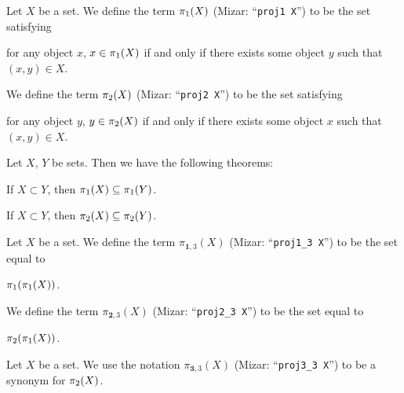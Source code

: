 \documentclass{article}
\begin{document}
\begin{definition}
  Let $X$ be a set.
  We define the term $\pi_{1}(X)$ (Mizar: ``\verb#proj1 X#'') to be the
  set satisfying
  \begin{defn}\label{xtuple0:defn:proj1}
  \item for any object $x$, $x\in\pi_{1}(X)$ if and only if there exists
    some object $y$ such that $(x,y)\in X$.
  \end{defn}
  We define the term $\pi_{2}(X)$ (Mizar: ``\verb#proj2 X#'') to be the
  set satisfying
  \begin{defn}\label{xtuple0:defn:proj2}
  \item for any object $y$, $y\in\pi_{2}(X)$ if and only if there exists
    some object $x$ such that $(x,y)\in X$.
  \end{defn}
\end{definition}

Let $X$, $Y$ be sets. Then we have the following theorems:
\begin{thm}
\item\label{xtuple0:8} If $X\subset Y$, then $\pi_{1}(X)\subseteq\pi_{1}(Y)$.
\item\label{xtuple0:9} If $X\subset Y$, then $\pi_{2}(X)\subseteq\pi_{2}(Y)$.
\end{thm}

\begin{definition}
  Let $X$ be a set.
  We define the term $\pi_{\mathbf{1},3}(X)$ (Mizar: ``\verb#proj1_3 X#'') to be the
  set equal to
  \begin{defn}
  \item $\pi_{1}(\pi_{1}(X))$.
  \end{defn}
  We define the term $\pi_{\mathbf{2},3}(X)$ (Mizar: ``\verb#proj2_3 X#'') to be the
  set equal to
  \begin{defn}
  \item $\pi_{2}(\pi_{1}(X))$.
  \end{defn}
\end{definition}

\begin{notation}
Let $X$ be a set. We use the notation $\pi_{\mathbf{3},3}(X)$ (Mizar: ``\verb#proj3_3 X#'') to be a
synonym for $\pi_{2}(X)$.
\end{notation}
\end{document}
